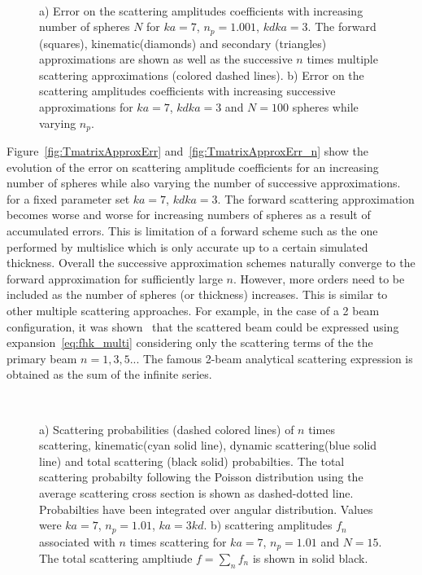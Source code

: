 \begin{figure}[h!]
  \centering
  \vspace{-1.1em}
  \\
\caption{
a) Error on the scattering amplitudes coefficients with increasing number of spheres
$N$ for $ka=7$, $n_p=1.001$, $kdka=3$. The forward (squares), kinematic(diamonds)
and secondary (triangles) approximations are shown as well as the successive
$n$ times multiple scattering approximations (colored dashed lines).
b) Error on the scattering amplitudes coefficients with increasing successive
approximations for $ka=7$, $kdka=3$ and $N=100$ spheres while varying $n_p$.
}%
\end{figure}

Figure~\ref{fig:TmatrixApproxErr} and~\ref{fig:TmatrixApproxErr_n} show the
evolution of the error on scattering amplitude coefficients for an increasing
number of spheres while also varying the number of successive approximations.
for a fixed parameter set $ka=7$, $kdka=3$.
The forward scattering approximation becomes worse and worse for increasing
numbers of spheres as a result of accumulated errors. This is limitation of
a forward scheme such as the one performed by multislice which is only accurate
up to a certain simulated thickness.
Overall the successive approximation schemes naturally converge to the forward
approximation for sufficiently large $n$. However, more orders need to be included
as the number of spheres (or thickness) increases. This is similar to other
multiple scattering approaches. For example, in the case of a 2 beam
configuration, it was shown~\cite{ref:CowleyMoodie1957} that the scattered
beam could be expressed using expansion~\ref{eq:fhk_multi} considering only
the scattering terms of the the primary beam $n=1,3,5..$. The famous 2-beam
analytical scattering expression is obtained as the sum of the infinite series.



\begin{figure}[h!]
  \centering
  \\
  \vspace{-1.1em}
  \caption{
a) Scattering probabilities (dashed colored lines) of $n$ times scattering,
kinematic(cyan solid line), dynamic scattering(blue solid line) and
total scattering (black solid) probabilties.
The total scattering  probabilty following the Poisson distribution using the average
scattering cross section is shown as dashed-dotted line.
Probabilties have been integrated over angular distribution. Values were $ka=7$,
$n_p=1.01$, $ka=3kd$.
b) scattering amplitudes $f_n$ associated with $n$ times scattering for $ka=7$,
$n_p=1.01$ and $N=15$. The total scattering ampltiude $f=\sum_n f_n $ is shown
in solid black.
}%
\end{figure}

